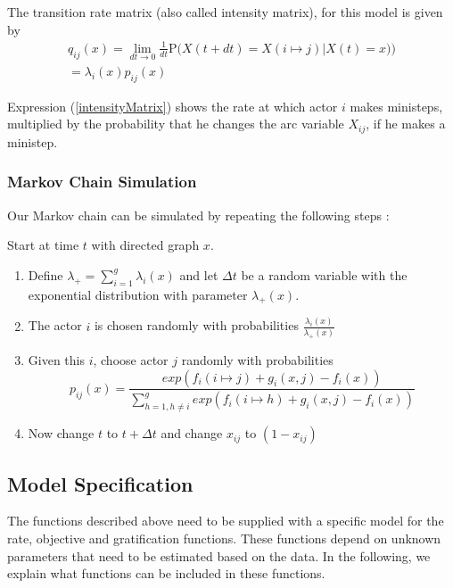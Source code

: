 \documentclass[11pt]{report}
\begin{document}
The transition rate matrix (also called intensity matrix), for this model is given by
\begin{multline}
\label{intensityMatrix}
q_{ij}(x) = \lim_{dt \to 0} \frac{1}{dt} \mathrm {P} \big({X(t + dt) = X(i \mapsto j) | X(t) = x)}\big) \\ = \lambda_i(x) p_{ij}(x)
\end{multline}

Expression (\ref{intensityMatrix}) shows the rate at which actor $i$ makes ministeps, multiplied by the probability that he changes the arc variable $X_{ij}$, if he makes a ministep.\\

\subsubsection{Markov Chain Simulation}
\label{MarkovChainSimulationSteps}
Our Markov chain can be simulated by repeating the following steps \cite{Snijders2004}:

Start at time $t$ with directed graph $x$. 
\begin{enumerate}
\item Define $\lambda_{+} = \sum_{i=1}^g \lambda_i(x)$ and let $\Delta t$ be a random variable with the exponential distribution with parameter $\lambda_{+}(x)$.
\item The actor $i$ is chosen randomly with probabilities $\frac{\lambda_{i}(x)}{\lambda_{+}(x)}$
\item Given this $i$, choose actor $j$ randomly with probabilities 
\begin{equation}
p_{ij}(x) = \frac{exp(f_i(i \mapsto j) + g_i(x, j) - f_i(x))}{\sum_{h=1, h \neq i}^{g} exp(f_i(i \mapsto h) + g_i(x, j) - f_i(x))} \nonumber
\end{equation}
\item Now change $t$ to $t + \Delta t$ and change $x_{ij}$ to $(1 - x_{ij})$
\end{enumerate}

\subsection{Model Specification}
The functions described above need to be supplied with a specific model for the rate, objective and gratification functions. These functions depend on unknown parameters that need to be estimated based on the data. In the following, we explain what functions can be included in these functions.
\end{document}

